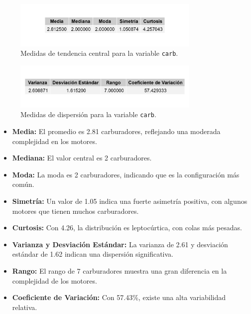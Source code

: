 \documentclass{article}
\begin{document}
\begin{enumerate}
	      \begin{figure}[H]
		      \centering
		      \includegraphics[width=0.8\textwidth]{MTC/carb_central.png}
		      \caption{Medidas de tendencia central para la variable \texttt{carb}.}
		      \label{fig:carb_central}
	      \end{figure}

	      \begin{figure}[H]
		      \centering
		      \includegraphics[width=0.8\textwidth]{MTC/carb_dispersion.png}
		      \caption{Medidas de dispersión para la variable \texttt{carb}.}
		      \label{fig:carb_dispersion}
	      \end{figure}
	    
	      \begin{itemize}
		      \item \textbf{Media:} El promedio es 2.81 carburadores, reflejando una moderada complejidad en los motores.
		      \item \textbf{Mediana:} El valor central es 2 carburadores.
		      \item \textbf{Moda:} La moda es 2 carburadores, indicando que es la configuración más común.
		      \item \textbf{Simetría:} Un valor de 1.05 indica una fuerte asimetría positiva, con algunos motores que tienen muchos carburadores.
		      \item \textbf{Curtosis:} Con 4.26, la distribución es leptocúrtica, con colas más pesadas.
		      \item \textbf{Varianza y Desviación Estándar:} La varianza de 2.61 y desviación estándar de 1.62 indican una dispersión significativa.
		      \item \textbf{Rango:} El rango de 7 carburadores muestra una gran diferencia en la complejidad de los motores.
		      \item \textbf{Coeficiente de Variación:} Con 57.43\%, existe una alta variabilidad relativa.
	      \end{itemize}


\end{enumerate}
\end{document}
